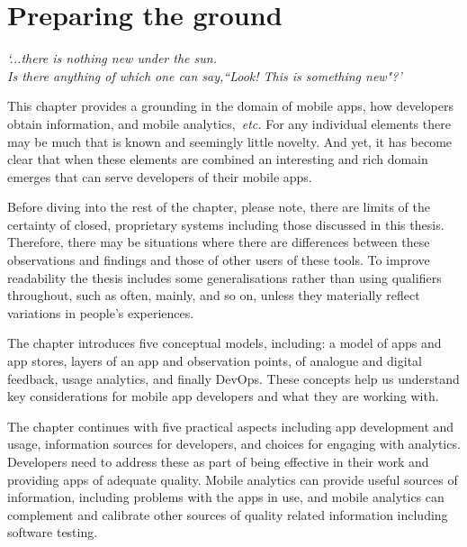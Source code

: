 \chapter{Preparing the ground}
\label{chapter-preparing-the-ground}
\emph{`...there is nothing new under the sun. \\Is there anything of which one can say,``Look! This is something new"?'}~

\vspace{10mm}

This chapter provides a grounding in the domain of mobile apps, how developers obtain information, and mobile analytics,~\emph{etc.}  
For any individual elements there may be much that is known and seemingly little novelty. And yet, it has become clear that when these elements are combined an interesting and rich domain emerges that can serve developers of their mobile apps.

Before diving into the rest of the chapter, please note, 
there are limits of the certainty of closed, proprietary systems including those discussed in this thesis. Therefore, there may be situations where there are differences between these observations and findings and those of other users of these tools. To improve readability the thesis includes some generalisations rather than using qualifiers throughout, such as often, mainly, and so on, unless they materially reflect variations in people's experiences.

The chapter introduces five 
conceptual models, including: a model of apps and app stores, layers of an app and observation points, of analogue and digital feedback, usage analytics, and finally DevOps. These concepts help us understand key considerations for mobile app developers and what they are working with.

The chapter continues with five practical aspects including app development and usage, information sources for developers, and choices for engaging with analytics. Developers need to address these as part of being effective in their work and providing apps of adequate quality. Mobile analytics can provide useful sources of information, including problems with the apps in use, and mobile analytics can complement and calibrate other sources of quality related information including software testing. 

